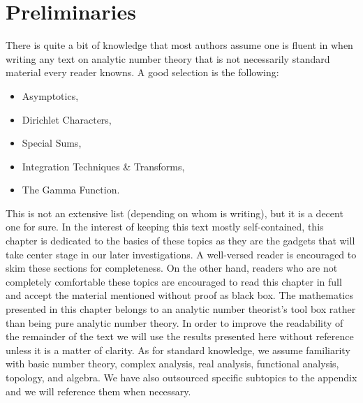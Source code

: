   \chapter{Preliminaries}\label{ch:Preliminaries}
    There is quite a bit of knowledge that most authors assume one is fluent in when writing any text on analytic number theory that is not necessarily standard material every reader knowns. A good selection is the following:
    \begin{itemize}
      \item Asymptotics,
      \item Dirichlet Characters,
      \item Special Sums,
      \item Integration Techniques \& Transforms,
      \item The Gamma Function.
    \end{itemize}
    This is not an extensive list (depending on whom is writing), but it is a decent one for sure. In the interest of keeping this text mostly self-contained, this chapter is dedicated to the basics of these topics as they are the gadgets that will take center stage in our later investigations. A well-versed reader is encouraged to skim these sections for completeness. On the other hand, readers who are not completely comfortable these topics are encouraged to read this chapter in full and accept the material mentioned without proof as black box. The mathematics presented in this chapter belongs to an analytic number theorist's tool box rather than being pure analytic number theory. In order to improve the readability of the remainder of the text we will use the results presented here without reference unless it is a matter of clarity. As for standard knowledge, we assume familiarity with basic number theory, complex analysis, real analysis, functional analysis, topology, and algebra. We have also outsourced specific subtopics to the appendix and we will reference them when necessary.
